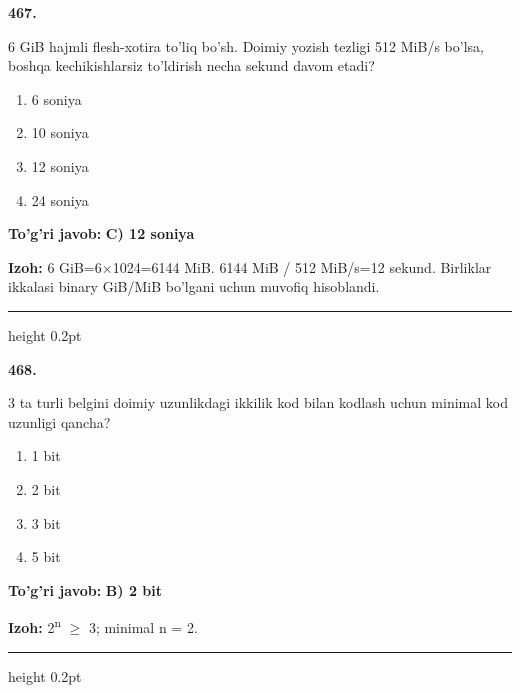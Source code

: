 \documentclass[10pt,a4paper,oneside]{article}
\begin{document}
\noindent\textbf{\color{ink}467.}
\par
6 GiB hajmli flesh-xotira to'liq bo'sh. Doimiy yozish tezligi 512 MiB/s bo'lsa, boshqa kechikishlarsiz to'ldirish necha sekund davom etadi?
\begin{enumerate}[label=\Alph*),leftmargin=9mm]
\item 6 soniya
\item 10 soniya
\item 12 soniya
\item 24 soniya
\end{enumerate}
\begin{tcolorbox}[enhanced,breakable,colback=teal!4,colframe=teal!50!black,boxrule=0.5pt,arc=1.1mm,left=3mm,right=3mm,top=1.7mm,bottom=1.7mm,before skip=2mm,after skip=2mm]
\textbf{\color{teal}To'g'ri javob:} \textbf{C) 12 soniya}
\par\smallskip
\textbf{Izoh:} 6 GiB=6\ensuremath{\times}1024=6144 MiB. 6144 MiB / 512 MiB/s=12 sekund. Birliklar ikkalasi binary GiB/MiB bo'lgani uchun muvofiq hisoblandi.
\end{tcolorbox}
\vspace{2mm}\hrule height 0.2pt \vspace{3mm}

\noindent\textbf{\color{ink}468.}
\par
3 ta turli belgini doimiy uzunlikdagi ikkilik kod bilan kodlash uchun minimal kod uzunligi qancha?
\begin{enumerate}[label=\Alph*),leftmargin=9mm]
\item 1 bit
\item 2 bit
\item 3 bit
\item 5 bit
\end{enumerate}
\begin{tcolorbox}[enhanced,breakable,colback=teal!4,colframe=teal!50!black,boxrule=0.5pt,arc=1.1mm,left=3mm,right=3mm,top=1.7mm,bottom=1.7mm,before skip=2mm,after skip=2mm]
\textbf{\color{teal}To'g'ri javob:} \textbf{B) 2 bit}
\par\smallskip
\textbf{Izoh:} 2\textsuperscript{n} \ensuremath{\geq} 3; minimal n = 2.
\end{tcolorbox}
\vspace{2mm}\hrule height 0.2pt \vspace{3mm}
\end{document}
